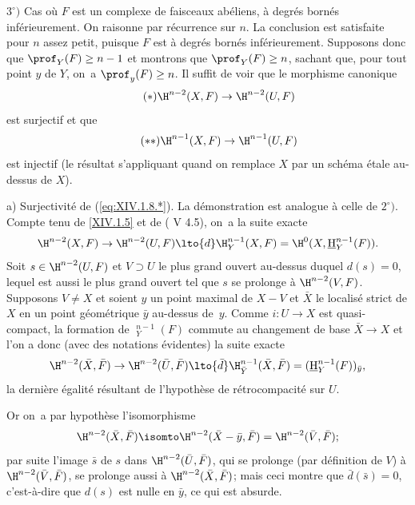 $3^\circ)$ Cas o\`u $F$ est un complexe de faisceaux ab\'eliens, \`a degr\'es born\'es inf\'erieurement. On raisonne par r\'ecurrence sur $n$. La conclusion est satisfaite pour $n$ assez petit, puisque $F$ est \`a degr\'es born\'es inf\'erieurement. Supposons donc que $\prof_Y(F)\geq n-1$ et montrons que $\prof_Y(F)\geq n$, sachant que, pour tout point $y$ de $Y$, on~a $\prof_y(F)\geq n$. Il suffit de voir que le morphisme canonique
\begin{equation*} \label{eq:XIV.1.8.*} \tag{$*$} {\H^{n-2}(X, F)\to \H^{n-2}(U, F)}
\end{equation*}
est surjectif et que
\begin{equation*} \label{eq:XIV.1.8.**} \tag{$**$} {\H^{n-1}(X, F)\to \H^{n-1}(U, F)}
\end{equation*}
est injectif (le r\'esultat s'appliquant quand on remplace $X$ par un sch\'ema \'etale au-dessus de $X$).

a) Surjectivit\'e de (\ref{eq:XIV.1.8.*}). La d\'emonstration est analogue \`a celle de $2^\circ)$. Compte tenu de \ref{XIV.1.5} et de ( V 4.5), on~a la suite exacte
$$
\H^{n-2}(X, F)\to \H^{n-2}(U, F)\lto{d}\H^{n-1}_Y(X, F)=\H^0(X, {\mathop{\underline{\mathrm{H}}}\nolimits}_Y^{n-1}(F)).
$$
Soit $s\in \H^{n-2}(U, F)$ et $V\supset U$ le plus grand ouvert au-dessus duquel $d(s)=0$, lequel est aussi le plus grand ouvert tel que $s$ se prolonge \`a $\H^{n-2}(V, F)$. Supposons $V\neq X$ et soient $y$ un point maximal de $X-V$ et $\bar X$ le localis\'e strict de $X$ en un point g\'eom\'etrique $\bar y$ au-dessus de~$y$. Comme $i:U\to X$ est quasi-compact, la formation de ${\mathop{\underline{\mathrm{H}}}\nolimits}_Y^{n-1}(F)$ commute au changement de base $\bar X\to X$ et l'on a donc (avec des notations \'evidentes) la suite exacte
$$
\H^{n-2}(\bar X, \bar F)\to \H^{n-2}(\bar U, \bar F)\lto{\bar d}\H^{n-1}_{\bar Y}(\bar X, \bar F)=({\mathop{\underline{\mathrm{H}}}\nolimits}_Y^{n-1}(F))_{\bar y},
$$
la derni\`ere \'egalit\'e r\'esultant de l'hypoth\`ese de r\'etrocompacit\'e sur $U$.

Or on~a par hypoth\`ese l'isomorphisme
$$
\H^{n-2}(\bar X, \bar F)\isomto \H^{n-2}(\bar X-\bar y, \bar F)=\H^{n-2}(\bar V, \bar F);
$$
par suite l'image $\bar s$ de $s$ dans $\H^{n-2}(\bar U, \bar F)$, qui se prolonge (par d\'efinition de $V$) \`a $\H^{n-2}(\bar V, \bar F)$, se prolonge aussi \`a $\H^{n-2}(\bar X, \bar F)$; mais ceci montre que $\bar d(\bar s)=0$, c'est-\`a-dire que $d(s)$ est nulle en $\bar y$, ce qui est absurde.


